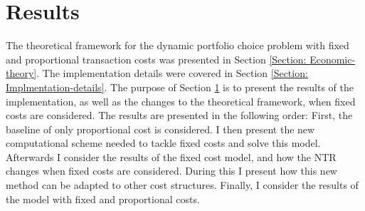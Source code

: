 \documentclass[11pt]{article}
\begin{document}
\fi

\section{Results} \label{Section: Results} 
The theoretical framework for the dynamic portfolio choice problem with fixed and proportional transaction costs was presented in Section \ref{Section: Economic-theory}.
The implementation details were covered in Section \ref{Section: Implmentation-details}. The purpose of Section \ref{Section: Results} is to present the results of the implementation,
as well as the changes to the theoretical framework, when fixed costs are considered. The results are presented in the following order: First, the baseline of only proportional cost is considered.
I then present the new computational scheme needed to tackle fixed costs and solve this model. Afterwards I consider the results of the fixed cost model, and how the \ac{NTR} changes when fixed costs are considered.
During this I present how this new method can be adapted to other cost structures. 
Finally, I consider the results of the model with fixed and proportional costs.
\end{document}
